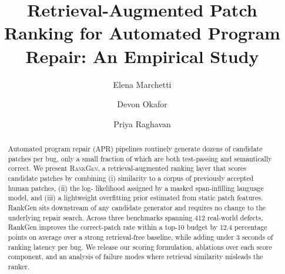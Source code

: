 \documentclass[sigconf,review,anonymous]{acmart}
\begin{document}
\title{Retrieval-Augmented Patch Ranking for Automated Program Repair: An Empirical Study}

\author{Elena Marchetti}

\author{Devon Okafor}

\author{Priya Raghavan}

\renewcommand{\shortauthors}{Marchetti et al.}

\begin{abstract}
Automated program repair (APR) pipelines routinely generate dozens of candidate patches per
bug, only a small fraction of which are both test-passing and semantically correct. We
present \textsc{RankGen}, a retrieval-augmented ranking layer that scores candidate patches
by combining (i) similarity to a corpus of previously accepted human patches, (ii) the log-
likelihood assigned by a masked span-infilling language model, and (iii) a lightweight
overfitting prior estimated from static patch features. RankGen sits downstream of any
candidate generator and requires no change to the underlying repair search. Across three
benchmarks spanning 412 real-world defects, RankGen improves the correct-patch rate within a
top-10 budget by 12.4 percentage points on average over a strong retrieval-free baseline,
while adding under 3 seconds of ranking latency per bug. We release our scoring formulation,
ablations over each score component, and an analysis of failure modes where retrieval
similarity misleads the ranker.
\end{abstract}



\maketitle
\end{document}
